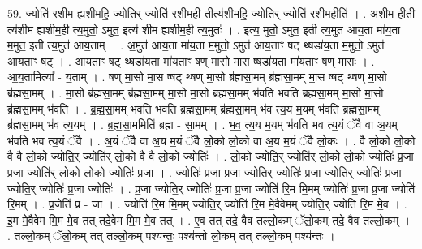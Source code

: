 \documentclass[17pt]{extarticle}
\begin{document}
59. ज्योति॑ रशीम ह्यशीमहि॒ ज्योति॒र् ज्योति॑ रशीम॒ही तीत्य॑शीमहि॒ ज्योति॒र् ज्योति॑ रशीम॒हीति॑ । . अ॒शी॒म॒ हीती त्य॑शीम ह्यशीम॒ही त्य॒मुतो॒ ऽमुत॒ इत्य॑ शीम ह्यशीम॒ही त्य॒मुतः॑ । . इत्य॒ मुतो॒ ऽमुत॒ इती त्य॒मुत॑ आय॒ता मा॑य॒ता म॒मुत॒ इती त्य॒मुत॑ आय॒ताम् । . अ॒मुत॑ आय॒ता मा॑य॒ता म॒मुतो॒ ऽमुत॑ आय॒ताꣳ षट् थ्षडा॑य॒ता म॒मुतो॒ ऽमुत॑ आय॒ताꣳ षट् । . आ॒य॒ताꣳ षट् थ्षडा॑य॒ता मा॑य॒ताꣳ षण् मा॒सो मा॒स ष्षडा॑य॒ता मा॑य॒ताꣳ षण् मा॒सः । . आ॒य॒तामित्या᳚ - य॒ताम् । . षण् मा॒सो मा॒स ष्षट् थ्षण् मा॒सो ब्र॑ह्मसा॒मम् ब्र॑ह्मसा॒मम् मा॒स ष्षट् थ्षण् मा॒सो ब्र॑ह्मसा॒मम् । . मा॒सो ब्र॑ह्मसा॒मम् ब्र॑ह्मसा॒मम् मा॒सो मा॒सो ब्र॑ह्मसा॒मम् भ॑वति भवति ब्रह्मसा॒मम् मा॒सो मा॒सो ब्र॑ह्मसा॒मम् भ॑वति । . ब्र॒ह्म॒सा॒मम् भ॑वति भवति ब्रह्मसा॒मम् ब्र॑ह्मसा॒मम् भ॑व त्य॒य म॒यम् भ॑वति ब्रह्मसा॒मम् ब्र॑ह्मसा॒मम् भ॑व त्य॒यम् । . ब्र॒ह्म॒सा॒ममिति॑ ब्रह्म - सा॒मम् । . भ॒व॒ त्य॒य म॒यम् भ॑वति भव त्य॒यं ॅवै वा अ॒यम् भ॑वति भव त्य॒यं ॅवै । . अ॒यं ॅवै वा अ॒य म॒यं ॅवै लो॒को लो॒को वा अ॒य म॒यं ॅवै लो॒कः । . वै लो॒को लो॒को वै वै लो॒को ज्योति॒र् ज्योति॑र् लो॒को वै वै लो॒को ज्योतिः॑ । . लो॒को ज्योति॒र् ज्योति॑र् लो॒को लो॒को ज्योतिः॑ प्र॒जा प्र॒जा ज्योति॑र् लो॒को लो॒को ज्योतिः॑ प्र॒जा । . ज्योतिः॑ प्र॒जा प्र॒जा ज्योति॒र् ज्योतिः॑ प्र॒जा ज्योति॒र् ज्योतिः॑ प्र॒जा ज्योति॒र् ज्योतिः॑ प्र॒जा ज्योतिः॑ । . प्र॒जा ज्योति॒र् ज्योतिः॑ प्र॒जा प्र॒जा ज्योति॑ रि॒म मि॒मम् ज्योतिः॑ प्र॒जा प्र॒जा ज्योति॑ रि॒मम् । . प्र॒जेति॑ प्र - जा । . ज्योति॑ रि॒म मि॒मम् ज्योति॒र् ज्योति॑ रि॒म मे॒वैवेमम् ज्योति॒र् ज्योति॑ रि॒म मे॒व । . इ॒म मे॒वैवेम मि॒म मे॒व तत् तदे॒वेम मि॒म मे॒व तत् । . ए॒व तत् तदे॒ वैव तल्लो॒कम् ॅलो॒कम् तदे॒ वैव तल्लो॒कम् । . तल्लो॒कम् ॅलो॒कम् तत् तल्लो॒कम् पश्य॑न्तः॒ पश्य॑न्तो लो॒कम् तत् तल्लो॒कम् पश्य॑न्तः । \newline
\end{document}

